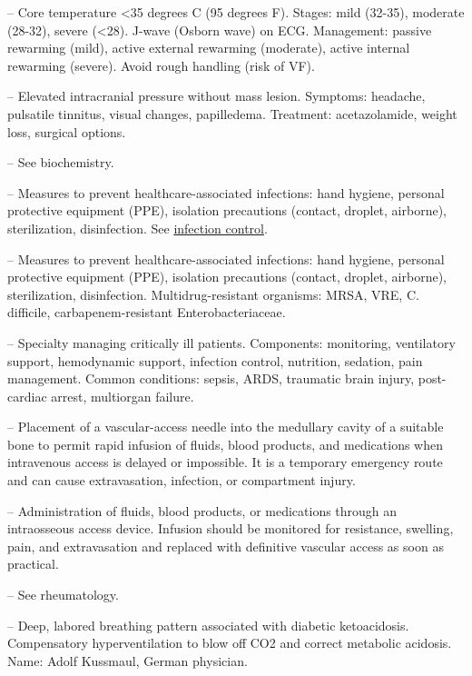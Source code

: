 -- Core temperature <35 degrees C (95 degrees F). Stages: mild (32-35), moderate (28-32), severe (<28). J-wave (Osborn wave) on ECG. Management: passive rewarming (mild), active external rewarming (moderate), active internal rewarming (severe). Avoid rough handling (risk of VF).

-- Elevated intracranial pressure without mass lesion. Symptoms: headache, pulsatile tinnitus, visual changes, papilledema. Treatment: acetazolamide, weight loss, surgical options.

-- See biochemistry.

-- Measures to prevent healthcare-associated infections: hand hygiene, personal protective equipment (PPE), isolation precautions (contact, droplet, airborne), sterilization, disinfection. See \hyperlink{Infection Control}{infection control}.

-- Measures to prevent healthcare-associated infections: hand hygiene, personal protective equipment (PPE), isolation precautions (contact, droplet, airborne), sterilization, disinfection. Multidrug-resistant organisms: MRSA, VRE, C. difficile, carbapenem-resistant Enterobacteriaceae.

-- Specialty managing critically ill patients. Components: monitoring, ventilatory support, hemodynamic support, infection control, nutrition, sedation, pain management. Common conditions: sepsis, ARDS, traumatic brain injury, post-cardiac arrest, multiorgan failure.

-- Placement of a vascular-access needle into the medullary cavity of a suitable bone to permit rapid infusion of fluids, blood products, and medications when intravenous access is delayed or impossible. It is a temporary emergency route and can cause extravasation, infection, or compartment injury.

-- Administration of fluids, blood products, or medications through an intraosseous access device. Infusion should be monitored for resistance, swelling, pain, and extravasation and replaced with definitive vascular access as soon as practical.

-- See rheumatology.

-- Deep, labored breathing pattern associated with diabetic ketoacidosis. Compensatory hyperventilation to blow off CO2 and correct metabolic acidosis. Name: Adolf Kussmaul, German physician.

